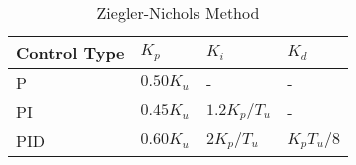 \begin{table}[H]
\centering
\begin{tabular}{|l|l|l|l|}
\hline
\textbf{Control Type} & \textbf{$K_p$}     & \textbf{$K_i$}        & \textbf{$K_d$}      \\ \hline
P            & $0.50K_u$ & -            & -          \\ \hline
PI           & $0.45K_u$ & $1.2K_p/T_u$ & -          \\ \hline
PID          & $0.60K_u$ & $2K_p/T_u$   & $K_pT_u/8$ \\ \hline
\end{tabular}
\caption{Ziegler-Nichols Method}
\label{Ziegler-Nichols_Method}
\end{table}